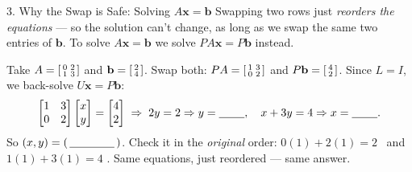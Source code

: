 \documentclass[10pt]{article}
\newcommand{\xx}{\mathbf{x}}
\newcommand{\bb}{\mathbf{b}}
\newcommand{\PP}{P}
\begin{document}
\begin{notesbox}{3. Why the Swap is Safe: Solving $A\xx=\bb$}
Swapping two rows just \emph{reorders the equations} --- so the solution can't change, as long as we swap
the same two entries of $\bb$. To solve $A\xx=\bb$ we solve $\PP A\xx=\PP\bb$ instead.

\vspace{3pt}
Take $A=\begin{bsmallmatrix} 0&2\\1&3 \end{bsmallmatrix}$ and $\bb=\begin{bsmallmatrix} 2\\4 \end{bsmallmatrix}$.
Swap both: $\PP A=\begin{bsmallmatrix} 1&3\\0&2 \end{bsmallmatrix}$ and
$\PP\bb=\begin{bsmallmatrix} 4\\2 \end{bsmallmatrix}$. Since $L=I$, we back-solve $U\xx=\PP\bb$:
\[
  \begin{bmatrix} 1 & 3 \\ 0 & 2 \end{bmatrix}\begin{bmatrix} x \\ y \end{bmatrix} = \begin{bmatrix} 4 \\ 2 \end{bmatrix}
  \;\Rightarrow\; 2y=2 \Rightarrow y = \blank{0.8cm},\quad x+3y=4 \Rightarrow x = \blank{0.8cm}.
\]
So $(x,y)=(\,\blank{1.4cm}\,)$. Check it in the \emph{original} order: $0(1)+2(1)=2$ \checkmark\ and
$1(1)+3(1)=4$ \checkmark. Same equations, just reordered --- same answer.
\end{notesbox}
\end{document}
